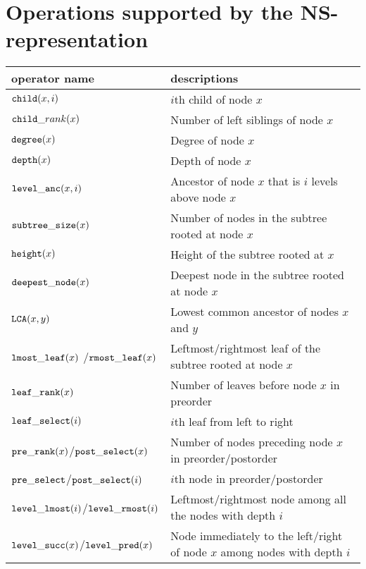 \section{Operations supported by the NS-representation}
\label{sec:operations}

\begin{table}[h]
\begin{center}
\begin{tabular} {|p{4.7cm}|p{7.2cm}|} \hline
operator name                             &descriptions        \\ \hline
$\mathtt{child}(x,i)$                         & $i$th child of node $x$\\
$\mathtt{child}\_rank(x)$                     & Number of left siblings of node $x$\\
$\mathtt{degree}(x)$                          &Degree of node $x$\\
$\mathtt{depth}(x)$                           & Depth of node $x$\\
$\mathtt{level\_anc}(x,i)$                      &Ancestor of node $x$ that is $i$ levels above node $x$ \\
$\mathtt{subtree\_size}(x)$                     &Number of nodes in the subtree rooted at node $x$ \\
$\mathtt{height}(x)$                          &Height of the subtree rooted at $x$ \\
$\mathtt{deepest\_node}(x)$                     &Deepest node in the subtree rooted at node $x$\\
$\mathtt{LCA}(x,y)$                           &Lowest common ancestor of nodes $x$ and $y$ \\
$\mathtt{lmost\_leaf}(x)$ /$\mathtt{rmost\_leaf}(x)$      &Leftmost/rightmost leaf of the subtree rooted at node $x$\\
$\mathtt{leaf\_rank}(x)$                        &Number of leaves before node $x$ in preorder\\
$\mathtt{leaf\_select}(i)$                      &$i$th leaf from left to right\\
$\mathtt{pre\_rank}(x)$/$\mathtt{post\_select}(x)$             &Number of nodes preceding node $x$ in preorder/postorder\\
$\mathtt{pre\_select}$/$\mathtt{post\_select}(i)$            &$i$th node in preorder/postorder\\       
$\mathtt{level\_lmost}(i)$/$\mathtt{level\_rmost}(i)$       &Leftmost/rightmost node among all the nodes with depth $i$ \\
$\mathtt{level\_succ}(x)$/$\mathtt{level\_pred}(x)$        &Node immediately to the left/right of node $x$ among nodes with depth $i$\\ \hline

\end{tabular}
\end{center}
\end{table}
